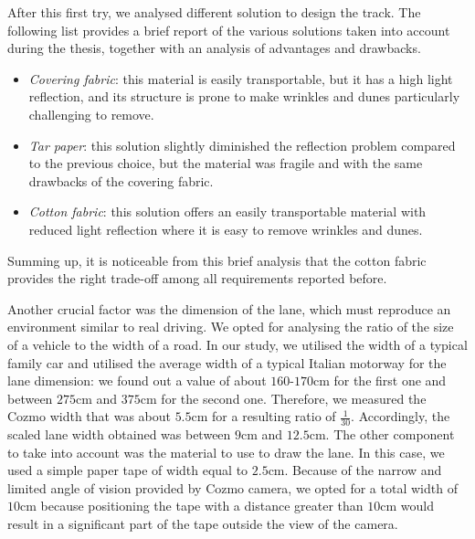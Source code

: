 After this first try, we analysed different solution to design the track.
The following list provides a brief report of the various solutions taken into account during the thesis, together with an analysis of advantages and drawbacks.

\begin{itemize}
    \item \textit{Covering fabric}: this material is easily transportable, but it has a high light reflection, and its structure is prone to make wrinkles and dunes particularly challenging to remove.
    \item \textit{Tar paper}: this solution slightly diminished the reflection problem compared to the previous choice, but the material was fragile and with the same drawbacks of the covering fabric.
    \item \textit{Cotton fabric}: this solution offers an easily transportable material with reduced light reflection where it is easy to remove wrinkles and dunes.
\end{itemize}

Summing up, it is noticeable from this brief analysis that the cotton fabric provides the right trade-off among all requirements reported before.

Another crucial factor was the dimension of the lane, which must reproduce an environment similar to real driving.
We opted for analysing the ratio of the size of a vehicle to the width of a road.
In our study, we utilised the width of a typical family car and utilised the average width of a typical Italian motorway for the lane dimension: we found out a value of about $160$-$170$cm for the first one and between $275$cm and $375$cm for the second one.
Therefore, we measured the Cozmo width that was about $5.5$cm for a resulting ratio of $\frac{1}{30}$.
Accordingly, the scaled lane width obtained was between $9$cm and $12.5$cm.
The other component to take into account was the material to use to draw the lane. In this case, we used a simple paper tape of width equal to $2.5$cm. Because of the narrow and limited angle of vision provided by Cozmo camera, we opted for a total width of$10$cm because positioning the tape with a distance greater than $10$cm would result in a significant part of the tape outside the view of the camera.